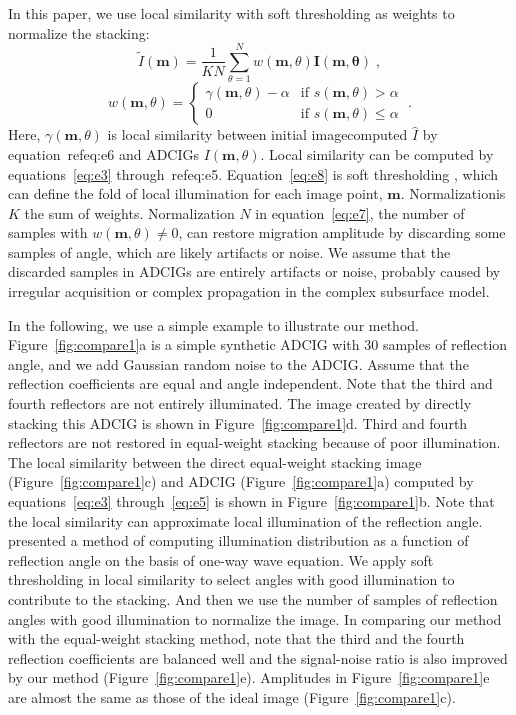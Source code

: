 In this paper, we use local similarity with soft thresholding as weights to normalize the stacking: 
\begin{equation}
  \label{eq:e7}
  \widetilde{I} (\mathbf{m}) = \frac{1}{KN} \sum_{\theta=1}^{N}w(\mathbf{m} , \theta)\mathbf{I}(\mathbf{m},\mathbf{\theta})\;,
\end{equation}
\begin{equation}
  \label{eq:e8}
  w(\mathbf{m} , \theta) = \left\{ \begin{array}{ll} \gamma(\mathbf{m} , \theta) - \alpha & \textrm{if $s(\mathbf{m} , \theta) > \alpha$} \\
  0 & \textrm{if $s(\mathbf{m} , \theta) \leq \alpha$} \end{array}\right.\;.
\end{equation}
Here, $\gamma (\mathbf{m},\theta)$ is local similarity between initial imagecomputed $\widehat{I}$ by equation~ref{eq:e6} and ADCIGs $I(\mathbf{m},\theta)$. Local similarity can be computed by equations~\ref{eq:e3} through~ref{eq:e5}. Equation~\ref{eq:e8} is soft thresholding \cite[]{Donoho}, which can define the fold of local illumination for each image point, $\mathbf{m}$. Normalizationis $K$ the sum of weights. Normalization $N$ in equation~\ref{eq:e7}, the number of samples with $w(\mathbf{m},\theta)\ne 0$, can restore migration amplitude by discarding some samples of angle, which are likely artifacts or noise. We assume that the discarded samples in ADCIGs are entirely artifacts or noise, probably caused by irregular acquisition or complex propagation in the complex subsurface model. 


In the following, we use a simple example to illustrate our method. Figure~\ref{fig:compare1}a is a simple synthetic ADCIG with 30 samples of reflection angle, and we add Gaussian random noise to the ADCIG. Assume that the reflection coefficients are equal and angle independent. Note that the third and fourth reflectors are not entirely illuminated. The image created by directly stacking this ADCIG is shown in Figure~\ref{fig:compare1}d. Third and fourth reflectors are not restored in equal-weight stacking because of poor illumination. The local similarity between the direct equal-weight stacking image (Figure~\ref{fig:compare1}c) and ADCIG (Figure~\ref{fig:compare1}a) computed by equations~\ref{eq:e3} through~\ref{eq:e5} is shown in Figure~\ref{fig:compare1}b. Note that the local similarity can approximate local illumination of the reflection angle. \cite{Xie2006} presented a method of computing illumination distribution as a function of reflection angle on the basis of one-way wave equation. We apply soft thresholding in local similarity to select angles with good illumination to contribute to the stacking. And then we use the number of samples of reflection angles with good illumination to normalize the image. In comparing our method with the equal-weight stacking method, note that the third and the fourth reflection coefficients are balanced well and the signal-noise ratio is also improved by our method (Figure~\ref{fig:compare1}e). Amplitudes in Figure~\ref{fig:compare1}e are almost the same as those of the ideal image (Figure~\ref{fig:compare1}c). 

